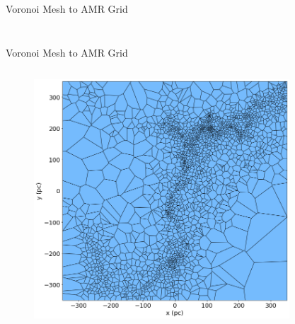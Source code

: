 \documentclass[aspectratio=169]{beamer}
\begin{document}
\begin{frame}{Voronoi Mesh to AMR Grid}
\begin{columns}
\begin{column}{0.44\textwidth}
\begin{figure}[h!]
                \label{fig:amr_example}
            \end{figure}
        \end{column}
    \end{columns}
\end{frame} 

\begin{frame}{Voronoi Mesh to AMR Grid} %
    \begin{columns}
        \begin{column}{0.3\textwidth}
            \begin{figure}[h!]
                \centering
                \includegraphics[width=\linewidth]{../images/voronoi_mesh.png}
                \label{fig:voronoi_example}
            \end{figure}
        \end{column}
        \begin{column}{0.3\textwidth}
            \begin{figure}[h!]
                \centering

\end{figure}
\end{column}
\end{columns}
\end{frame}
\end{document}

